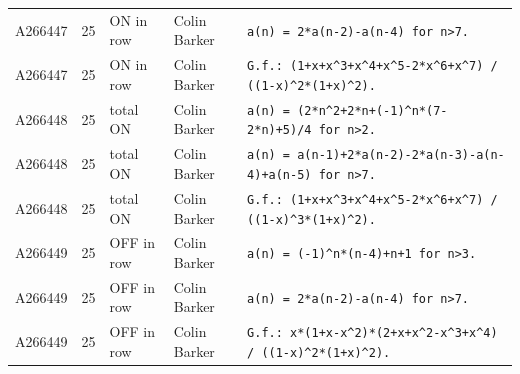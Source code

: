 \documentclass[11pt]{article}
\theoremstyle{definition}
\theoremstyle{remark}
\begin{document}
{\begin{longtable}{p{1.3cm}p{0.7cm}p{2.4cm}p{2.3cm}p{7.3cm}}
A266447 & 25 & ON in row & Colin Barker & \texttt{a(n)\allowbreak{} \allowbreak{}=\allowbreak{} \allowbreak{}2*\allowbreak{}a(n-\allowbreak{}2)\allowbreak{}-\allowbreak{}a(n-\allowbreak{}4)\allowbreak{} \allowbreak{}for \allowbreak{}n>7.} \\
A266447 & 25 & ON in row & Colin Barker & \texttt{G.f.: \allowbreak{}(1+\allowbreak{}x+\allowbreak{}x\^{}3+\allowbreak{}x\^{}4+\allowbreak{}x\^{}5-\allowbreak{}2*\allowbreak{}x\^{}6+\allowbreak{}x\^{}7)\allowbreak{} \allowbreak{}/\allowbreak{} \allowbreak{}((1-\allowbreak{}x)\allowbreak{}\^{}2*\allowbreak{}(1+\allowbreak{}x)\allowbreak{}\^{}2)\allowbreak{}.} \\
A266448 & 25 & total ON & Colin Barker & \texttt{a(n)\allowbreak{} \allowbreak{}=\allowbreak{} \allowbreak{}(2*\allowbreak{}n\^{}2+\allowbreak{}2*\allowbreak{}n+\allowbreak{}(-\allowbreak{}1)\allowbreak{}\^{}n*\allowbreak{}(7-\allowbreak{}2*\allowbreak{}n)\allowbreak{}+\allowbreak{}5)\allowbreak{}/\allowbreak{}4 \allowbreak{}for \allowbreak{}n>2.} \\
A266448 & 25 & total ON & Colin Barker & \texttt{a(n)\allowbreak{} \allowbreak{}=\allowbreak{} \allowbreak{}a(n-\allowbreak{}1)\allowbreak{}+\allowbreak{}2*\allowbreak{}a(n-\allowbreak{}2)\allowbreak{}-\allowbreak{}2*\allowbreak{}a(n-\allowbreak{}3)\allowbreak{}-\allowbreak{}a(n-\allowbreak{}4)\allowbreak{}+\allowbreak{}a(n-\allowbreak{}5)\allowbreak{} \allowbreak{}for \allowbreak{}n>7.} \\
A266448 & 25 & total ON & Colin Barker & \texttt{G.f.: \allowbreak{}(1+\allowbreak{}x+\allowbreak{}x\^{}3+\allowbreak{}x\^{}4+\allowbreak{}x\^{}5-\allowbreak{}2*\allowbreak{}x\^{}6+\allowbreak{}x\^{}7)\allowbreak{} \allowbreak{}/\allowbreak{} \allowbreak{}((1-\allowbreak{}x)\allowbreak{}\^{}3*\allowbreak{}(1+\allowbreak{}x)\allowbreak{}\^{}2)\allowbreak{}.} \\
A266449 & 25 & OFF in row & Colin Barker & \texttt{a(n)\allowbreak{} \allowbreak{}=\allowbreak{} \allowbreak{}(-\allowbreak{}1)\allowbreak{}\^{}n*\allowbreak{}(n-\allowbreak{}4)\allowbreak{}+\allowbreak{}n+\allowbreak{}1 \allowbreak{}for \allowbreak{}n>3.} \\
A266449 & 25 & OFF in row & Colin Barker & \texttt{a(n)\allowbreak{} \allowbreak{}=\allowbreak{} \allowbreak{}2*\allowbreak{}a(n-\allowbreak{}2)\allowbreak{}-\allowbreak{}a(n-\allowbreak{}4)\allowbreak{} \allowbreak{}for \allowbreak{}n>7.} \\
A266449 & 25 & OFF in row & Colin Barker & \texttt{G.f.: \allowbreak{}x*\allowbreak{}(1+\allowbreak{}x-\allowbreak{}x\^{}2)\allowbreak{}*\allowbreak{}(2+\allowbreak{}x+\allowbreak{}x\^{}2-\allowbreak{}x\^{}3+\allowbreak{}x\^{}4)\allowbreak{} \allowbreak{}/\allowbreak{} \allowbreak{}((1-\allowbreak{}x)\allowbreak{}\^{}2*\allowbreak{}(1+\allowbreak{}x)\allowbreak{}\^{}2)\allowbreak{}.} \\

\end{longtable}}
\end{document}
